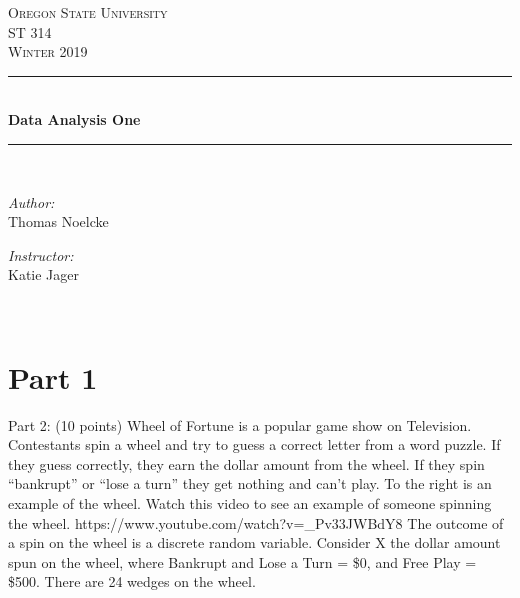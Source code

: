 \documentclass[letterpaper, onecolumn,10pt]{IEEEtran}
\begin{document}
    \begin{titlepage}
    \newcommand{\HRule}{\rule{\linewidth}{0.5mm}}
    \center
    \textsc{\Large Oregon State University}\\[1.5cm]
    \textsc{\Large ST 314}\\[0.5cm]
    \textsc{\Large Winter 2019}\\[0.5cm]
    \HRule \\[0.4cm]
    { \huge \bfseries Data Analysis One}\\[0.4cm] %
    \HRule \\[1.5cm]
    \begin{minipage}{0.4\textwidth}
        \begin{flushleft} \large
        \emph{Author:}\\
        Thomas Noelcke
        \end{flushleft}
    \end{minipage}
    \begin{minipage}{0.4\textwidth}
        \begin{flushright} \large
        \emph{Instructor:} \\
        Katie Jager\\
        \end{flushright}
    \end{minipage}\\[2cm]
		\end{titlepage}
        
        \iffalse
            Part 1. (8 points) For each random variable:
            (1 point) State whether the random variable should be modeled with a Binomial or a Poisson distribution.
            (1 point) Explain your reasoning.
            (1 point) State the parameter values that describe the distribution.
            (1 point) Give the specific probability mass function. 
        \fi
		\section{Part 1}
		
		\iffalse
Part 2: (10 points) Wheel of Fortune is a popular game show on Television.
Contestants spin a wheel and try to guess a correct letter from a word puzzle. If
they guess correctly, they earn the dollar amount from the wheel. If they spin
“bankrupt” or “lose a turn” they get nothing and can’t play. To the right is an
example of the wheel. Watch this video to see an example of someone spinning
the wheel. https://www.youtube.com/watch?v=\_Pv33JWBdY8
The outcome of a spin on the wheel is a discrete random variable. Consider X
the dollar amount spun on the wheel, where Bankrupt and Lose a Turn = \$0, and
Free Play = \$500. There are 24 wedges on the wheel. 
\end{document}
